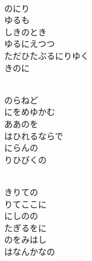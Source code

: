 \documentclass[10pt,b5j]{tarticle} %
\begin{document}
\begin{enumerate}
\begin{minipage}[c]{\blocksize}
        \vspace{\linespace}
        \item~\\
        のにり\\
        ゆるも\\
        しきのとき\\
        ゆるにえつつ\\
        ただひたぶるにりゆく\\
        きのに
        
    \end{minipage}
    \begin{minipage}[c]{\blocksize}
        
        \vspace{\linespace}
        \item~\\
        のらねど\\
        にをめゆかむ\\
        ああのを\\
        はひれるならで\\
        にらんの\\
        りひびくの
        
    \end{minipage}
    \begin{minipage}[c]{\blocksize}
        
        \vspace{\linespace}
        \item~\\
        きりての\\
        りてここに\\
        にしのの\\
        たぎるをに\\
        のをみはし\\
        はなんかなの
        

\end{minipage}
\end{enumerate}
\end{document}
